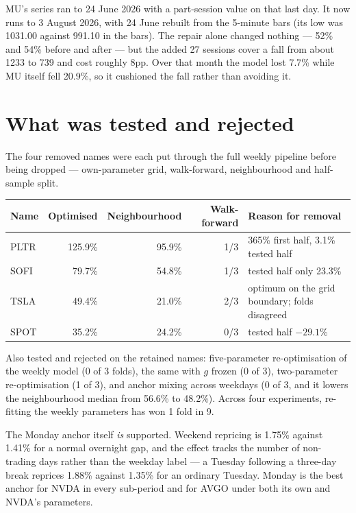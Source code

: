 \documentclass[11pt]{article}
\begin{document}
MU's series ran to 24 June 2026 with a part-session value on that last day. It now runs to
3 August 2026, with 24 June rebuilt from the 5-minute bars (its low was 1031.00 against 991.10 in
the bars). The repair alone changed nothing --- 52\% and 54\% before and after --- but the added
27 sessions cover a fall from about 1233 to 739 and cost roughly 8pp. Over that month the model
lost 7.7\% while MU itself fell 20.9\%, so it cushioned the fall rather than avoiding it.

\section{What was tested and rejected}

The four removed names were each put through the full weekly pipeline before being dropped ---
own-parameter grid, walk-forward, neighbourhood and half-sample split.

\begin{table}[H]\centering\small
\begin{tabular}{lrrrl}
\toprule
\textbf{Name} & \textbf{Optimised} & \textbf{Neighbourhood} & \textbf{Walk-forward} &
\textbf{Reason for removal}\\
\midrule
\rowcolor{bcwarn} PLTR & 125.9\% & 95.9\% & 1/3 & 365\% first half, 3.1\% tested half\\
SOFI & 79.7\%  & 54.8\% & 1/3 & tested half only 23.3\%\\
\rowcolor{bcwarn} TSLA & 49.4\%  & 21.0\% & 2/3 & optimum on the grid boundary; folds disagreed\\
SPOT & 35.2\%  & 24.2\% & 0/3 & tested half $-29.1$\%\\
\bottomrule
\end{tabular}
\end{table}

Also tested and rejected on the retained names: five-parameter re-optimisation of the weekly model
(0 of 3 folds), the same with $g$ frozen (0 of 3), two-parameter re-optimisation (1 of 3), and
anchor mixing across weekdays (0 of 3, and it lowers the neighbourhood median from 56.6\% to
48.2\%). Across four experiments, re-fitting the weekly parameters has won 1 fold in 9.

The Monday anchor itself \emph{is} supported. Weekend repricing is 1.75\% against 1.41\% for a
normal overnight gap, and the effect tracks the number of non-trading days rather than the
weekday label --- a Tuesday following a three-day break reprices 1.88\% against 1.35\% for an
ordinary Tuesday. Monday is the best anchor for NVDA in every sub-period and for AVGO under both
its own and NVDA's parameters.
\end{document}
